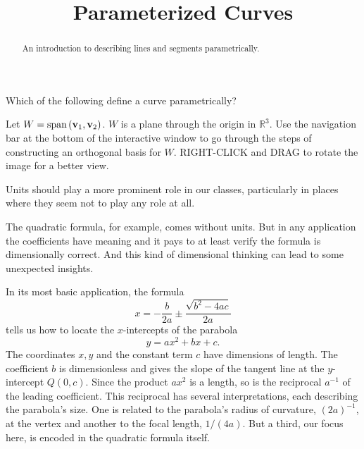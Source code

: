 \documentclass{ximera}
\title{Parameterized Curves}
\begin{document}
\begin{abstract}
An introduction to describing lines and segments parametrically.
\end{abstract}
\maketitle

\begin{exercise}  
  Which of the following define a curve parametrically?  
  \begin{multipleChoice}  
  \end{multipleChoice}  
\end{exercise}  

\begin{exploration}\label{exp:orth2}
Let $W =\mbox{span}\left({\bf v}_1,{\bf v}_2\right)$. $W$ is a plane through the origin in $\mathbb{R}^3$.  Use the navigation bar at the bottom of the interactive window to go through the steps of constructing an orthogonal basis for $W$.  RIGHT-CLICK and DRAG to rotate the image for a better view.
 
 
\begin{onlineOnly}
    \begin{center}
\end{center}
\end{onlineOnly}
\end{exploration}



Units should play a more prominent role in our classes, particularly in places where they seem not to play any role at all.

The quadratic formula, for example, comes without units. But in any application the coefficients have meaning and it pays to at least verify the formula is dimensionally correct. And this kind of dimensional thinking can lead to some unexpected insights. %

In its most basic application, the formula
\[
   x = -\frac{b}{2a}\pm \frac{\sqrt{b^2-4ac}}{2a}
\]
tells us how to locate the $x$-intercepts of the parabola 
\begin{equation}
 y=ax^2+bx+c.   \label{Eq:Parabola}
 \end{equation}
 The coordinates $x,y$ and the constant term $c$ have dimensions of length. The coefficient $b$ is dimensionless and gives the slope of the tangent line at the $y$-intercept $Q(0,c)$. Since the product $ax^2$ is a length, so is the reciprocal $a^{-1}$ of the leading coefficient. This reciprocal has several interpretations, each describing the parabola's size. One is related to the parabola's radius of curvature, $(2a)^{-1}$, at the vertex and another to the focal length, $1/(4a)$. But a third, our focus here, is encoded in the quadratic formula itself.
\end{document}
